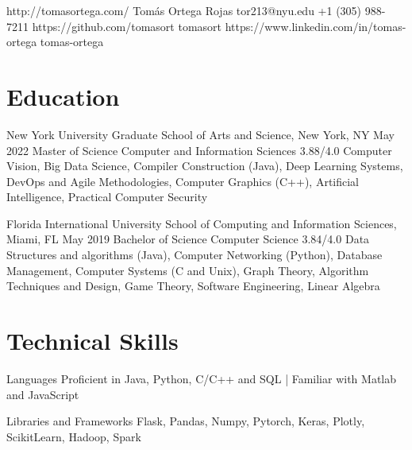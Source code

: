 \documentclass[letterpaper,10pt]{article}
\begin{document}
\head
  {http://tomasortega.com/}
  {Tomás Ortega Rojas}
  {tor213@nyu.edu}  %
  {+1 (305) 988-7211}
  {https://github.com/tomasort}
  {tomasort}
  {https://www.linkedin.com/in/tomas-ortega}
  {tomas-ortega}


\section{Education}
\sectionStart
  \educationItem
    {New York University}
    {Graduate School of Arts and Science, New York, NY} 
    {May 2022}
    {Master of Science} 
    {Computer and Information Sciences} 
    {3.88/4.0}
    {Computer Vision, 
      Big Data Science, 
      Compiler Construction (Java), 
      Deep Learning Systems, 
      DevOps and Agile Methodologies, 
      Computer Graphics (C++), 
      Artificial Intelligence,
      Practical Computer Security}

  \educationItem
    {Florida International University}
    {School of Computing and Information Sciences, Miami, FL} 
    {May 2019}
    {Bachelor of Science} 
    {Computer Science} 
    {3.84/4.0}
    {Data Structures and algorithms (Java), 
      Computer Networking (Python), 
      Database Management, 
      Computer Systems (C and Unix), 
      Graph Theory, 
      Algorithm Techniques and Design, 
      Game Theory, 
      Software Engineering, 
      Linear Algebra}
\sectionEnd

\section{Technical Skills}
\sectionStart

  \skillItem
    {Languages}
    {Proficient in Java, Python, C/C++ and SQL |
      Familiar with Matlab and JavaScript}

  \skillItem
    {Libraries and Frameworks}
    {Flask, 
      Pandas, 
      Numpy, 
      Pytorch, 
      Keras, 
      Plotly, 
      ScikitLearn, 
      Hadoop, 
      Spark}
\end{document}
